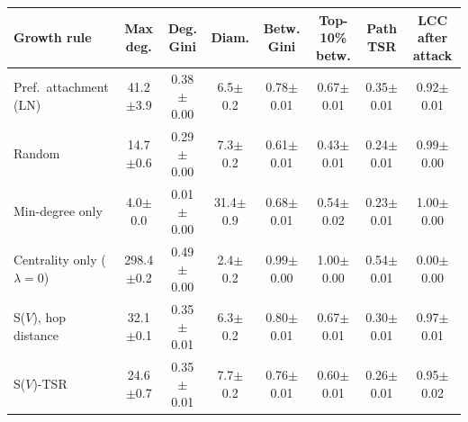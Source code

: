 \begin{tabular}{lccccccc}
\toprule
Growth rule & Max deg. & Deg. Gini & Diam. & Betw. Gini & Top-10\% betw. & Path TSR & LCC after attack \\
\midrule
Pref.\ attachment (LN) & 41.2$\pm$3.9 & 0.38$\pm$0.00 & 6.5$\pm$0.2 & 0.78$\pm$0.01 & 0.67$\pm$0.01 & 0.35$\pm$0.01 & 0.92$\pm$0.01 \\
Random & 14.7$\pm$0.6 & 0.29$\pm$0.00 & 7.3$\pm$0.2 & 0.61$\pm$0.01 & 0.43$\pm$0.01 & 0.24$\pm$0.01 & 0.99$\pm$0.00 \\
Min-degree only & 4.0$\pm$0.0 & 0.01$\pm$0.00 & 31.4$\pm$0.9 & 0.68$\pm$0.01 & 0.54$\pm$0.02 & 0.23$\pm$0.01 & 1.00$\pm$0.00 \\
Centrality only ($\lambda{=}0$) & 298.4$\pm$0.2 & 0.49$\pm$0.00 & 2.4$\pm$0.2 & 0.99$\pm$0.00 & 1.00$\pm$0.00 & 0.54$\pm$0.01 & 0.00$\pm$0.00 \\
S($V$), hop distance & 32.1$\pm$0.1 & 0.35$\pm$0.01 & 6.3$\pm$0.2 & 0.80$\pm$0.01 & 0.67$\pm$0.01 & 0.30$\pm$0.01 & 0.97$\pm$0.01 \\
S($V$)-TSR & 24.6$\pm$0.7 & 0.35$\pm$0.01 & 7.7$\pm$0.2 & 0.76$\pm$0.01 & 0.60$\pm$0.01 & 0.26$\pm$0.01 & 0.95$\pm$0.02 \\
\bottomrule
\end{tabular}

